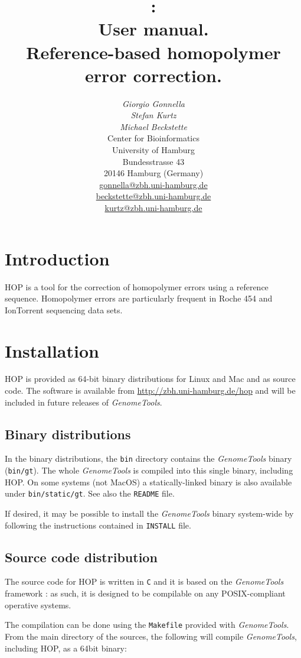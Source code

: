 \documentclass[12pt,titlepage]{article}
\title{\Huge{\Hop 1.0:\\ User manual.}\\[3mm]
\Large{Reference-based homopolymer error correction.}}
\author{\begin{tabular}{c}
         \textit{Giorgio Gonnella}\\
         \textit{Stefan Kurtz}\\
         \textit{Michael Beckstette}\\[2cm]
         Center for Bioinformatics\\
         University of Hamburg\\
         Bundesstrasse 43\\
         20146 Hamburg (Germany)\\[1cm]
         \url{gonnella@zbh.uni-hamburg.de}\\
         \url{beckstette@zbh.uni-hamburg.de}\\
         \url{kurtz@zbh.uni-hamburg.de}\\[1cm]
        \end{tabular}}
\newcommand{\GenomeTools}{\textit{GenomeTools}\xspace}
\newcommand{\Hop}{{HOP}\xspace}
\begin{document}
\maketitle

\section{Introduction} \label{Introduction}

\Hop \cite{HOP} is a tool for the correction of homopolymer errors using a
reference sequence. Homopolymer errors are particularly frequent in
Roche 454 and IonTorrent sequencing data sets.

\section{Installation}

\Hop is provided as 64-bit binary distributions for Linux and Mac and
as source code. The software is available from
\url{http://zbh.uni-hamburg.de/hop} and will be included in
future releases of \GenomeTools.

\subsection{Binary distributions}

In the binary distributions, the \texttt{bin} directory contains the
\GenomeTools binary (\texttt{bin/gt}). The whole \GenomeTools is compiled
into this single binary, including \Hop. On some systems (not MacOS)
a statically-linked binary is also available under \texttt{bin/static/gt}.
See also the \texttt{README} file.

If desired, it may be possible to install the
\GenomeTools binary system-wide by following the instructions contained
in \texttt{INSTALL} file.

\subsection{Source code distribution}

The source code for \Hop is written in \texttt{C} and it is based on
the \GenomeTools framework \cite{genometools}: as such, it is designed to
be compilable on any POSIX-compliant operative systems.

The compilation can be done using the \texttt{Makefile} provided with
\GenomeTools. From the main directory of the sources, the following will
compile \GenomeTools, including \Hop, as a 64bit binary:
\end{document}
